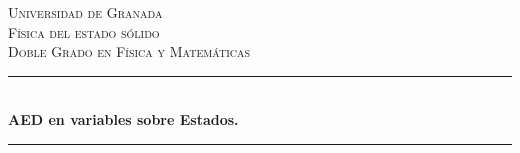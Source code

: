 





\begin{titlepage}

\newcommand{\HRule}{\rule{\linewidth}{0.5mm}} %

\center %
 
\textsc{\LARGE Universidad de Granada}\\[1.5cm] %
\textsc{\Large Física del estado sólido}\\[0.5cm] %
\textsc{\large Doble Grado en Física y Matemáticas}\\[0.5cm] %


\HRule \\[0.4cm]
{ \huge \bfseries AED en variables sobre Estados.}\\[0.2cm] %
\HRule \\[1cm]
 






\end{titlepage}
